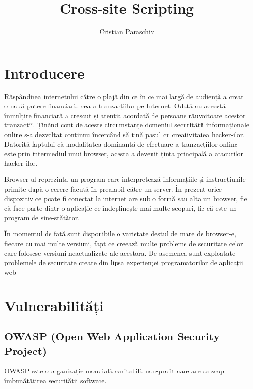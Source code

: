 \documentclass[12pt,a4paper,draft]{article}
\author{Cristian Paraschiv}
\title{Cross-site Scripting}
\begin{document}
	\section{Introducere} %
	\label{sec:Introducere}
	Răspândirea internetului către o plajă din ce în ce mai largă de audien\-ță a creat o nouă putere financiară: cea a tranzacțiilor pe Internet. Odată cu această înmulțire financiară a crescut și atenția acordată de persoane răuvoitoare acestor tranzacții. Ținând cont de aceste circumstanțe domeniul securității informaționale online s-a dezvoltat continuu încercând să țină pasul cu creativitatea hacker-ilor. Datorită faptului că modalitatea dominantă de efectuare a tranzacțiilor online este prin intermediul unui browser, acesta a devenit ținta principală a atacurilor hacker-ilor.
	
	Browser-ul reprezintă un program care interpretează informațiile și in\-strucțiunile primite după o cerere făcută în prealabil către un server. În prezent orice dispozitiv ce poate fi conectat la internet are sub o formă sau alta un browser, fie că face parte dintr-o aplicație ce îndeplinește mai multe scopuri, fie că este un program de sine-stătător.
	
	În momentul de față sunt disponibile o varietate destul de mare de \linebreak browser-e, fiecare cu mai multe versiuni, fapt ce creează multe probleme de securitate celor care folosesc versiuni neactualizate ale acestora. De asemenea sunt exploatate problemele de securitate create din lipsa experienței  programatorilor de aplicații web.
	
	\section{Vulnerabilități} %
	\label{sec:Vulnerabilități}
		\subsection{OWASP (Open Web Application Security Project)} %
		\label{sub:OWASP}
		OWASP este o organizație mondială caritabilă non-profit care are ca scop îmbunătățirea securității software.

	
\end{document}
